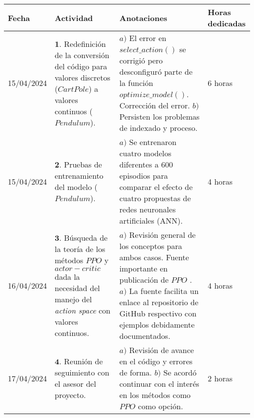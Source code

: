 \documentclass[12pt]{article}
\begin{document}
\begin{minipage}[h]{\textwidth}
	\centering
	\begin{tabularx}{\textwidth}{|p{2cm}|X|X|p{2cm}|} 
		\hline
		\rowcolor{encabezado}
		\textbf{Fecha} & 
		\textbf{Actividad} & 
		\textbf{Anotaciones} & 
		\textbf{Horas dedicadas} \\ \hline
	 	15/04/2024 & 
	 	$\mathbf{1}.$ Redefinición de la conversión del código para valores discretos ($CartPole$) a valores continuos ($Pendulum$). & 
	 	$a)$ El error en $select\_ action()$ se corrigió pero desconfiguró parte de la función $optimize\_ model()$. Corrección del error. \newline
	 	$b)$ Persisten los problemas de indexado y proceso. \newline & 
	 	6 horas \\
	 	15/04/2024 & 
	 	$\mathbf{2}.$ Pruebas de entrenamiento del modelo ($Pendulum$). & 
	 	$a)$ Se entrenaron cuatro modelos diferentes a $600$ episodios para comparar el efecto de cuatro propuestas de redes neuronales artificiales (ANN). \newline & 
	 	4 horas \\
		16/04/2024 & 
	 	$\mathbf{3}.$ Búsqueda de la teoría de los métodos $PPO$ y $actor-critic$ dada la necesidad del manejo del \textit{action space} con valores continuos. &
	 	$a)$ Revisión general de los conceptos para ambos casos. Fuente importante en publicación de \href{https://medium.com/analytics-vidhya/coding-ppo-from-scratch-with-pytorch-part-1-4-613dfc1b14c8}{$PPO$} \cite{PPObeginners}. \newline
	 	$a)$ La fuente \cite{PPObeginners} facilita un enlace al repositorio de GitHub respectivo con ejemplos debidamente documentados. \newline & 
	 	4 horas \\
	 	17/04/2024 & 
	 	$\mathbf{4}.$ Reunión de seguimiento con el asesor del proyecto. & 
	 	$a)$ Revisión de avance en el código y errores de forma.  \newline
	 	$b)$ Se acordó continuar con el interés en los métodos como $PPO$ como opción. & 
	 	2 horas \\

	 	\hline
	\end{tabularx}
\end{minipage}	 	
	 	
\end{document}
